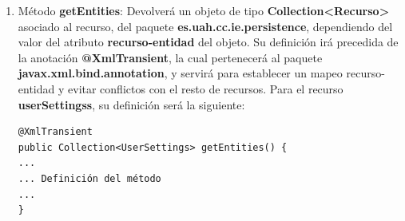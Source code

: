 \begin{enumerate}
\item Método \textbf{getEntities}: Devolverá un objeto de tipo \textbf{Collection<Recurso>} asociado al recurso, del paquete \textbf{es.uah.cc.ie.persistence}, dependiendo del valor del atributo \textbf{recurso-entidad} del objeto. Su definición irá precedida de la anotación \textbf{@XmlTransient}, la cual pertenecerá al paquete \textbf{javax.xml.bind.annotation}, y servirá para establecer un mapeo recurso-entidad y evitar conflictos con el resto de recursos. Para el recurso \textbf{userSettingss}, su definición será la siguiente:
\begin{verbatim}
@XmlTransient
public Collection<UserSettings> getEntities() {
...
... Definición del método
...
}
\end{verbatim}
\end{enumerate}


